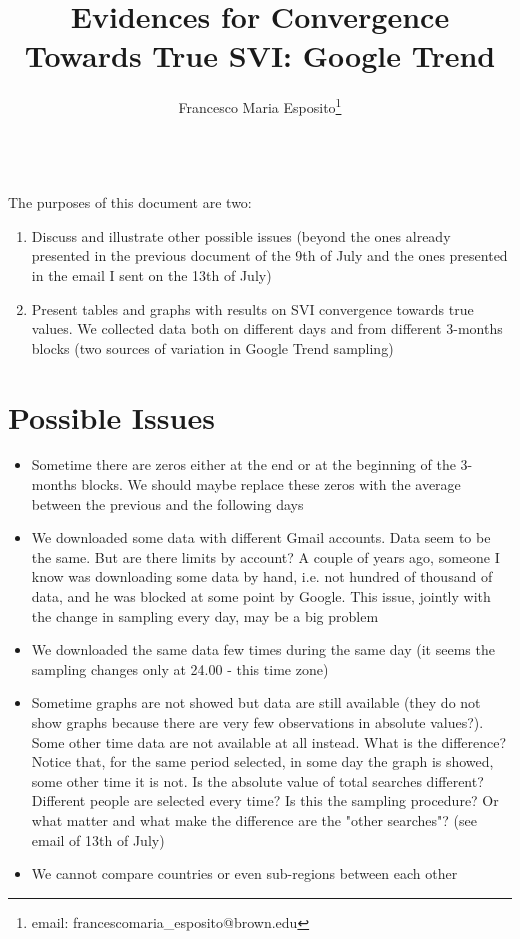 \documentclass[a4paper,12pt]{article}
\begin{document}
\title{Evidences for Convergence Towards True SVI: Google Trend}
\author{Francesco Maria Esposito\footnote{email: francescomaria\_esposito@brown.edu}}
\maketitle

\newpage

\\The purposes of this document are two:
\begin{enumerate}
\item Discuss and illustrate other possible issues (beyond the ones already presented in the previous document of the 9th of July and the ones presented in the email I sent on the 13th of July)
\item Present tables and graphs with results on SVI convergence towards true values. We collected data both on different days and from different 3-months blocks (two sources of variation in Google Trend sampling)
\end{enumerate}

\section{Possible Issues}
\begin{itemize}
\item Sometime there are zeros either at the end or at the beginning of the 3-months blocks. We should maybe replace these zeros with the average between the previous and the following days
\item We downloaded some data with different Gmail accounts. Data seem to be the same. But are there limits by account? A couple of years ago, someone I know was downloading some data by hand, i.e. not hundred of thousand of data, and he was blocked at some point by Google. This issue, jointly with the change in sampling every day, may be a big problem
\item We downloaded the same data few times during the same day (it seems the sampling changes only at 24.00 - this time zone)
\item Sometime graphs are not showed but data are still available (they do not show graphs because there are very few observations in absolute values?). Some other time data are not available at all instead. What is the difference? Notice that, for the same period selected, in some day the graph is showed, some other time it is not. Is the absolute value of total searches different? Different people are selected every time? Is this the sampling procedure? Or what matter and what make the difference are the "other searches"? (see email of 13th of July)
\item We cannot compare countries or even sub-regions between each other
\end{itemize}
\end{document}
